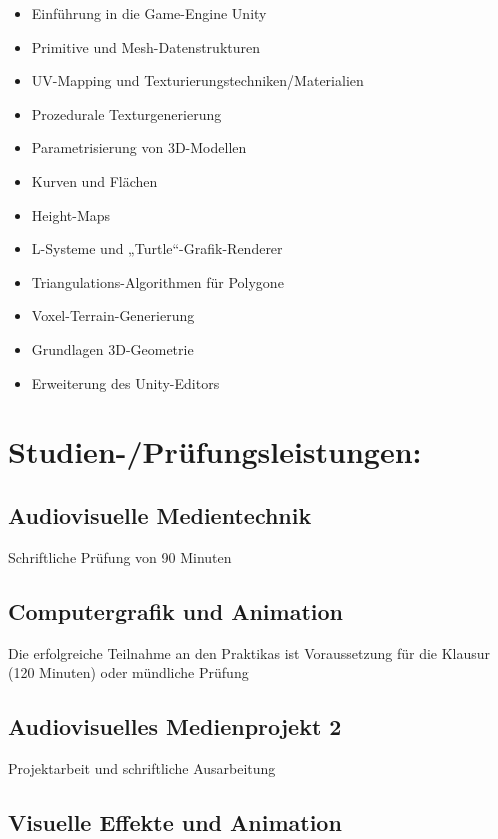 \begin{itemize}
\item
  Einführung in die Game-Engine Unity
\item
  Primitive und Mesh-Datenstrukturen
\item
  UV-Mapping und Texturierungstechniken/Materialien
\item
  Prozedurale Texturgenerierung
\item
  Parametrisierung von 3D-Modellen
\item
  Kurven und Flächen
\item
  Height-Maps
\item
  L-Systeme und „Turtle``-Grafik-Renderer
\item
  Triangulations-Algorithmen für Polygone
\item
  Voxel-Terrain-Generierung
\item
  Grundlagen 3D-Geometrie
\item
  Erweiterung des Unity-Editors
\end{itemize}

\section*{Studien-/Prüfungsleistungen:}\label{studien-pruxfcfungsleistungen-23}

\subsection*{Audiovisuelle
Medientechnik}\label{audiovisuelle-medientechnik-2}

Schriftliche Prüfung von 90 Minuten

\subsection*{Computergrafik und
Animation}\label{computergrafik-und-animation-2}

Die erfolgreiche Teilnahme an den Praktikas ist Voraussetzung für die
Klausur (120 Minuten) oder mündliche Prüfung

\subsection*{Audiovisuelles Medienprojekt
2}\label{audiovisuelles-medienprojekt-2-2}

Projektarbeit und schriftliche Ausarbeitung

\subsection*{Visuelle Effekte und
Animation}\label{visuelle-effekte-und-animation-2}

